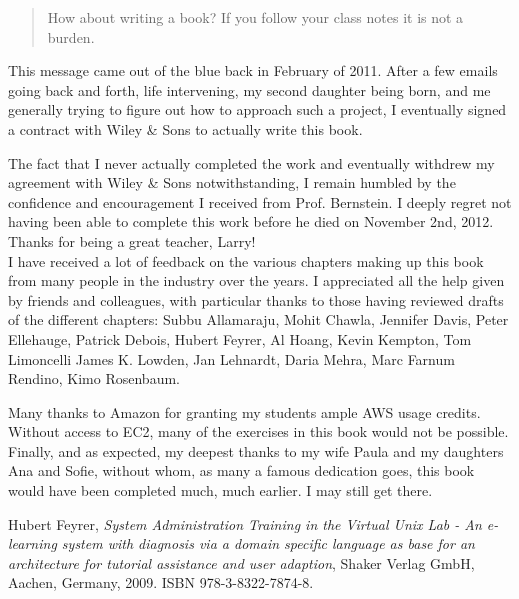 \begin{quote}
How about writing a book? If you follow your class
notes it is not a burden.
\end{quote}

This message came out of the blue back in February of
2011.  After a few emails going back and forth, life
intervening, my second daughter being born, and me
generally trying to figure out how to approach such a
project, I eventually signed a contract with Wiley \&
Sons to actually write this book.

The fact that I never actually completed the work and
eventually withdrew my agreement with Wiley \& Sons
notwithstanding, I remain humbled by the confidence
and encouragement I received from Prof. Bernstein.  I
deeply regret not having been able to complete this
work before he died on November 2nd, 2012.  Thanks for
being a great teacher, Larry!
\\

I have received a lot of feedback on the various
chapters making up this book from many people in the
industry over the years.  I appreciated all the help
given by friends and colleagues, with particular
thanks to those having reviewed drafts of the
different chapters:
Subbu Allamaraju,
Mohit Chawla,
Jennifer Davis,
Peter Ellehauge,
Patrick Debois,
Hubert Feyrer,
Al Hoang,
Kevin Kempton,
Tom Limoncelli
James K. Lowden,
Jan Lehnardt,
Daria Mehra,
Marc Farnum Rendino,
Kimo Rosenbaum.

Many thanks to Amazon for granting my students ample
AWS usage credits.  Without access to EC2, many of the
exercises in this book would not be possible.
\\

Finally, and as expected, my deepest thanks to my wife
Paula and my daughters Ana and Sofie, without whom, as
many a famous dedication goes, this book would have
been completed much, much earlier.  I may still get
there.


\pagebreak

\begin{thebibliography}{99}

Hubert Feyrer, {\em System Administration Training in
the Virtual Unix Lab - An e-learning system with diagnosis via a domain
specific language as base for an architecture for tutorial assistance and
user adaption}, Shaker Verlag GmbH, Aachen, Germany, 2009. ISBN
978-3-8322-7874-8.


\end{thebibliography}
